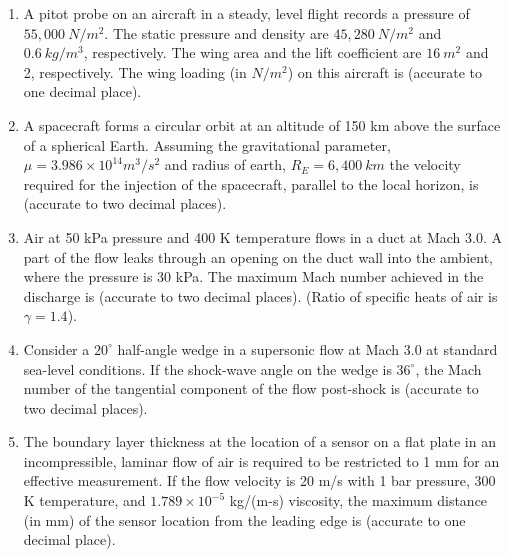 \documentclass[journal,12pt,onecolumn]{IEEEtran}
\theoremstyle{remark}
\begin{document}
\begin{enumerate}
    \item A pitot probe on an aircraft in a steady, level flight records a pressure of $55,000~N/m^{2}$. The static pressure and density are $45,280~N/m^{2}$ and $0.6~kg/m^{3}$, respectively. The wing area and the lift coefficient are $16~m^{2}$ and 2, respectively. The wing loading (in $N/m^{2}$) on this aircraft is \underline{\hspace{2cm}} (accurate to one decimal place).
    \hfill{}

    \item A spacecraft forms a circular orbit at an altitude of 150 km above the surface of a spherical Earth. Assuming the gravitational parameter, $\mu=3.986\times10^{14}m^{3}/s^{2}$ and radius of earth, $R_{E}=6,400~km$ the velocity required for the injection of the spacecraft, parallel to the local horizon, is \underline{\hspace{2cm}} (accurate to two decimal places).
    \hfill{}

    \item Air at 50 kPa pressure and 400 K temperature flows in a duct at Mach 3.0. A part of the flow leaks through an opening on the duct wall into the ambient, where the pressure is 30 kPa. The maximum Mach number achieved in the discharge is \underline{\hspace{2cm}} (accurate to two decimal places). (Ratio of specific heats of air is $\gamma=1.4$).
    \hfill{}

    \item Consider a $20^{\circ}$ half-angle wedge in a supersonic flow at Mach 3.0 at standard sea-level conditions. If the shock-wave angle on the wedge is $36^{\circ}$, the Mach number of the tangential component of the flow post-shock is \underline{\hspace{2cm}} (accurate to two decimal places).
    \hfill{}

    \item The boundary layer thickness at the location of a sensor on a flat plate in an incompressible, laminar flow of air is required to be restricted to 1 mm for an effective measurement. If the flow velocity is 20 m/s with 1 bar pressure, 300 K temperature, and $1.789\times10^{-5}$ kg/(m-s) viscosity, the maximum distance (in mm) of the sensor location from the leading edge is \underline{\hspace{2cm}} (accurate to one decimal place).
    \hfill{}


\end{enumerate}
\end{document}
